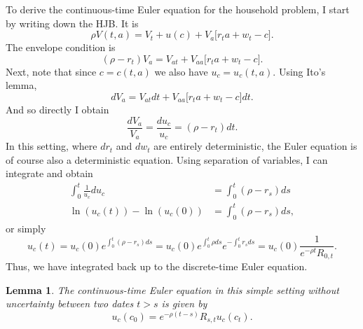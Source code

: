 \documentclass[11pt]{extarticle}
\theoremstyle{plain}
\newtheorem{lem}[thm]{Lemma}
\theoremstyle{definition}
\begin{document}
\vspace{3mm}
\noindent
To derive the continuous-time Euler equation for the household problem, I start by writing down the HJB. It is 
\begin{equation*}
	\rho V(t,a) = V_t + u(c) + V_a \Big[ r_t a + w_t - c \Big]. 
\end{equation*}
The envelope condition is 
\begin{equation*}
	(\rho - r_t) V_a = V_{at} +  V_{aa} \Big[ r_t a + w_t - c \Big] .
\end{equation*}
Next, note that since $c = c(t,a)$ we also have $u_c = u_c(t,a)$. Using Ito's lemma, 
\begin{equation*}
	dV_a = V_{at} dt + V_{aa} \Big[ r_t a + w_t - c \Big] dt. 
\end{equation*}
And so directly I obtain 
\begin{equation*}
	\frac{dV_a}{V_a} = \frac{du_c}{u_c} =  (\rho - r_t) dt. 
\end{equation*}
In this setting, where $dr_t$ and $dw_t$ are entirely deterministic, the Euler equation is of course also a deterministic equation. Using separation of variables, I can integrate and obtain 
\begin{align*}
	\int_0^t \frac{1}{u_c} du_c &=  \int_0^t (\rho - r_s) ds \\
	\ln(u_c(t)) - \ln(u_c(0)) &=  \int_0^t (\rho - r_s) ds,
\end{align*}
or simply 
\begin{equation*}
	u_c(t) = u_c(0) e^{\int_0^t (\rho - r_s) ds} = u_c(0) e^{\int_0^t \rho ds} e^{- \int_0^t r_s ds} = u_c(0) \frac{1 }{e^{-\rho t}R_{0,t}}.
\end{equation*}
Thus, we have integrated back up to the discrete-time Euler equation. 


\begin{lem} 
	
	The continuous-time Euler equation in this simple setting without uncertainty between two dates $t > s$ is given by
	\begin{equation*}
		u_c(c_0) = e^{- \rho (t-s)} R_{s,t} u_c(c_t). 
	\end{equation*}
\end{lem}
\end{document}
